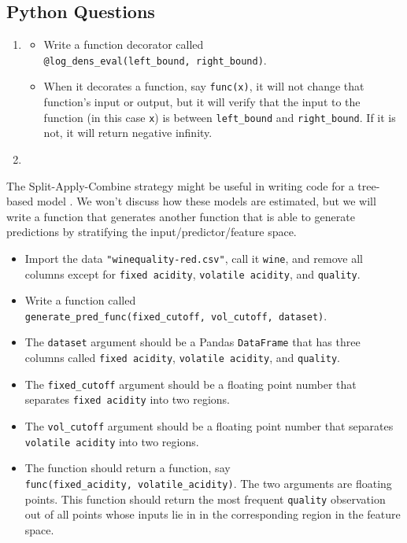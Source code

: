 \documentclass[
  12pt,
  krantz2]{krantz}
\providecommand{\tightlist}{%
  \setlength{\itemsep}{0pt}\setlength{\parskip}{0pt}}
\begin{document}
\hypertarget{python-questions-11}{%
\subsection{Python Questions}\label{python-questions-11}}

\begin{enumerate}
\def\labelenumi{\arabic{enumi}.}
\item
  \begin{itemize}
  \tightlist
  \item
    Write a function decorator called \texttt{@log\_dens\_eval(left\_bound,\ right\_bound)}.
  \item
    When it decorates a function, say \texttt{func(x)}, it will not change that function's input or output, but it will verify that the input to the function (in this case \texttt{x}) is between \texttt{left\_bound} and \texttt{right\_bound}. If it is not, it will return negative infinity.
  \end{itemize}
\item
\end{enumerate}

The Split-Apply-Combine strategy might be useful in writing code for a tree-based model \citep{trees}. We won't discuss how these models are estimated, but we will write a function that generates another function that is able to generate predictions by stratifying the input/predictor/feature space.

\begin{itemize}
\tightlist
\item
  Import the data \texttt{"winequality-red.csv"}, call it \texttt{wine}, and remove all columns except for \texttt{fixed\ acidity}, \texttt{volatile\ acidity}, and \texttt{quality}.
\item
  Write a function called \texttt{generate\_pred\_func(fixed\_cutoff,\ vol\_cutoff,\ dataset)}.
\item
  The \texttt{dataset} argument should be a Pandas \texttt{DataFrame} that has three columns called \texttt{fixed\ acidity}, \texttt{volatile\ acidity}, and \texttt{quality}.
\item
  The \texttt{fixed\_cutoff} argument should be a floating point number that separates \texttt{fixed\ acidity} into two regions.
\item
  The \texttt{vol\_cutoff} argument should be a floating point number that separates \texttt{volatile\ acidity} into two regions.
\item
  The function should return a function, say \texttt{func(fixed\_acidity,\ volatile\_acidity)}. The two arguments are floating points. This function should return the most frequent \texttt{quality} observation out of all points whose inputs lie in in the corresponding region in the feature space.
\end{itemize}
\end{document}
